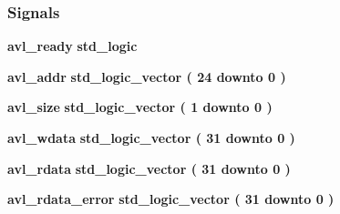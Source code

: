 \subsubsection*{Signals}
 \begin{DoxyCompactItemize}
\item 
{\bf avl\+\_\+ready} {\bfseries \textcolor{comment}{std\+\_\+logic}\textcolor{vhdlchar}{ }} 
\item 
{\bf avl\+\_\+addr} {\bfseries \textcolor{comment}{std\+\_\+logic\+\_\+vector}\textcolor{vhdlchar}{ }\textcolor{vhdlchar}{(}\textcolor{vhdlchar}{ }\textcolor{vhdlchar}{ } \textcolor{vhdldigit}{24} \textcolor{vhdlchar}{ }\textcolor{keywordflow}{downto}\textcolor{vhdlchar}{ }\textcolor{vhdlchar}{ } \textcolor{vhdldigit}{0} \textcolor{vhdlchar}{ }\textcolor{vhdlchar}{)}\textcolor{vhdlchar}{ }} 
\item 
{\bf avl\+\_\+size} {\bfseries \textcolor{comment}{std\+\_\+logic\+\_\+vector}\textcolor{vhdlchar}{ }\textcolor{vhdlchar}{(}\textcolor{vhdlchar}{ }\textcolor{vhdlchar}{ } \textcolor{vhdldigit}{1} \textcolor{vhdlchar}{ }\textcolor{keywordflow}{downto}\textcolor{vhdlchar}{ }\textcolor{vhdlchar}{ } \textcolor{vhdldigit}{0} \textcolor{vhdlchar}{ }\textcolor{vhdlchar}{)}\textcolor{vhdlchar}{ }} 
\item 
{\bf avl\+\_\+wdata} {\bfseries \textcolor{comment}{std\+\_\+logic\+\_\+vector}\textcolor{vhdlchar}{ }\textcolor{vhdlchar}{(}\textcolor{vhdlchar}{ }\textcolor{vhdlchar}{ } \textcolor{vhdldigit}{31} \textcolor{vhdlchar}{ }\textcolor{keywordflow}{downto}\textcolor{vhdlchar}{ }\textcolor{vhdlchar}{ } \textcolor{vhdldigit}{0} \textcolor{vhdlchar}{ }\textcolor{vhdlchar}{)}\textcolor{vhdlchar}{ }} 
\item 
{\bf avl\+\_\+rdata} {\bfseries \textcolor{comment}{std\+\_\+logic\+\_\+vector}\textcolor{vhdlchar}{ }\textcolor{vhdlchar}{(}\textcolor{vhdlchar}{ }\textcolor{vhdlchar}{ } \textcolor{vhdldigit}{31} \textcolor{vhdlchar}{ }\textcolor{keywordflow}{downto}\textcolor{vhdlchar}{ }\textcolor{vhdlchar}{ } \textcolor{vhdldigit}{0} \textcolor{vhdlchar}{ }\textcolor{vhdlchar}{)}\textcolor{vhdlchar}{ }} 
\item 
{\bf avl\+\_\+rdata\+\_\+error} {\bfseries \textcolor{comment}{std\+\_\+logic\+\_\+vector}\textcolor{vhdlchar}{ }\textcolor{vhdlchar}{(}\textcolor{vhdlchar}{ }\textcolor{vhdlchar}{ } \textcolor{vhdldigit}{31} \textcolor{vhdlchar}{ }\textcolor{keywordflow}{downto}\textcolor{vhdlchar}{ }\textcolor{vhdlchar}{ } \textcolor{vhdldigit}{0} \textcolor{vhdlchar}{ }\textcolor{vhdlchar}{)}\textcolor{vhdlchar}{ }} 

\end{DoxyCompactItemize}
